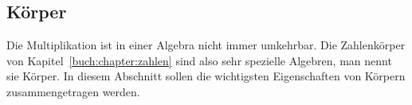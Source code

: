 %
%
%
\subsection{Körper
\label{buch:subsection:koerper}}
Die Multiplikation ist in einer Algebra nicht immer umkehrbar.
Die Zahlenkörper von Kapitel~\ref{buch:chapter:zahlen} sind also
sehr spezielle Algebren, man nennt sie Körper.
In diesem Abschnitt sollen die wichtigsten Eigenschaften von Körpern
zusammengetragen werden.






